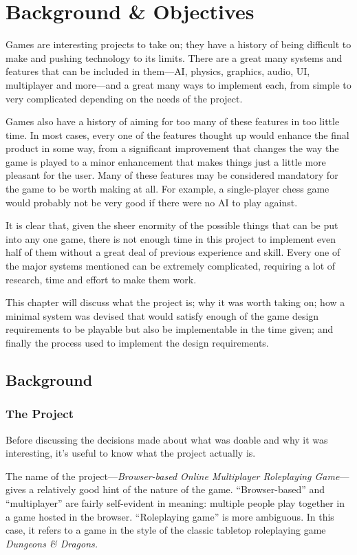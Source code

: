 \chapter{Background \& Objectives}

Games are interesting projects to take on; they have a history of being difficult to make and pushing technology to its limits. There are a great many systems and features that can be included in them---AI, physics, graphics, audio, UI, multiplayer and more---and a great many ways to implement each, from simple to very complicated depending on the needs of the project.

Games also have a history of aiming for too many of these features in too little time. In most cases, every one of the features thought up would enhance the final product in some way, from a significant improvement that changes the way the game is played to a minor enhancement that makes things just a little more pleasant for the user. Many of these features may be considered mandatory for the game to be worth making at all. For example, a single-player chess game would probably not be very good if there were no AI to play against.

It is clear that, given the sheer enormity of the possible things that can be put into any one game, there is not enough time in this project to implement even half of them without a great deal of previous experience and skill. Every one of the major systems mentioned can be extremely complicated, requiring a lot of research, time and effort to make them work.

This chapter will discuss what the project is; why it was worth taking on; how a minimal system was devised that would satisfy enough of the game design requirements to be playable but also be implementable in the time given; and finally the process used to implement the design requirements.

\section{Background}

\subsection{The Project}
Before discussing the decisions made about what was doable and why it was interesting, it's useful to know what the project actually is.

The name of the project---\textit{Browser-based Online Multiplayer Roleplaying Game}---gives a relatively good hint of the nature of the game. ``Browser-based'' and ``multiplayer'' are fairly self-evident in meaning: multiple people play together in a game hosted in the browser. ``Roleplaying game'' is more ambiguous. In this case, it refers to a game in the style of the classic tabletop roleplaying game \textit{Dungeons \& Dragons.}

